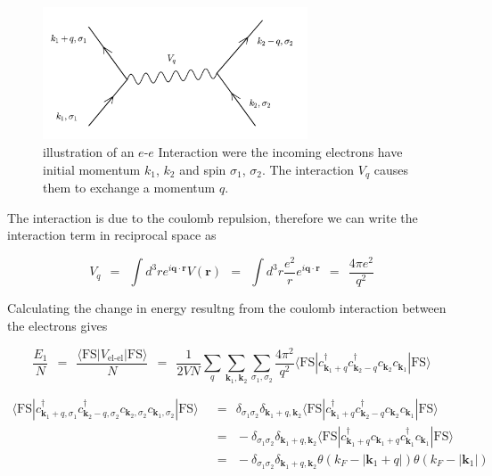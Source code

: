 \documentclass[10pt]{report}
\numberwithin{equation}{chapter}
\begin{document}
\begin{figure}
  \centering
  \includegraphics[width=0.7\textwidth]{../img/sq_interaction.pdf}
  \caption{illustration of an $e$-$e$ Interaction were the incoming electrons have initial momentum $k_1$, $k_2$ and spin $\sigma_1$, $\sigma_2$. The interaction $V_q$ causes them to exchange a momentum $q$.}
\end{figure}


The interaction is due to the coulomb repulsion, therefore we can write the interaction term in reciprocal space as 

\begin{equation}
  V_q ~~=~~ \int d^3r e^{i\mathbf{q} \cdot \mathbf{r}} V(\mathbf{r}) 
  ~~=~~ \int d^3r \frac{e^2}{r} e^{i \mathbf{q} \cdot \mathbf{r}} 
  ~~=~~ \frac{4\pi e^2}{q^2}
\end{equation}

Calculating the change in energy resultng from the coulomb interaction between the electrons gives

\begin{equation}
  \frac{E_1}{N} ~~=~~ \frac{\langle \text{FS} | V_\text{el-el} | \text{FS} \rangle}{N} 
  ~~=~~ \frac{1}{2VN} \sum_q \sum_{\mathbf{k}_1, \mathbf{k}_2} \sum_{\sigma_1, \sigma_2}
  \frac{4\pi^2}{q^2} 
  \langle \text{FS} | c^\dag_{\mathbf{k}_1+q} c^\dag_{\mathbf{k}_2-q} c_{\mathbf{k}_2} c_{\mathbf{k}_1} | \text{FS} \rangle  
\end{equation}

\begin{align}
  \langle \text{FS} | c^\dag_{\mathbf{k}_1+q, \sigma_1} c^\dag_{\mathbf{k}_2-q, \sigma_2} c_{\mathbf{k}_2, \sigma_2} c_{\mathbf{k}_1, \sigma_2} | \text{FS} \rangle 
  ~~& =~~ \delta_{\sigma_1 \sigma_2} \delta_{\mathbf{k}_1+q, \mathbf{k}_2} 
  \langle \text{FS} | c^\dag_{\mathbf{k}_1+q} c^\dag_{\mathbf{k}_2-q} c_{\mathbf{k}_2} c_{\mathbf{k}_1} | \text{FS} \rangle \nonumber \\
  ~~& =~~ -\delta_{\sigma_1 \sigma_2} \delta_{\mathbf{k}_1+q, \mathbf{k}_2} 
  \langle \text{FS} | c^\dag_{\mathbf{k}_1+q} c_{\mathbf{k}_1+q} c^\dag_{\mathbf{k}_1} c_{\mathbf{k}_1} | \text{FS} \rangle \nonumber \\
  ~~& =~~ -\delta_{\sigma_1 \sigma_2} \delta_{\mathbf{k}_1+q, \mathbf{k}_2}
  \theta(k_F - |\mathbf{k}_1+q |) \theta(k_F - | \mathbf{k}_1|)
\end{align}
\end{document}
